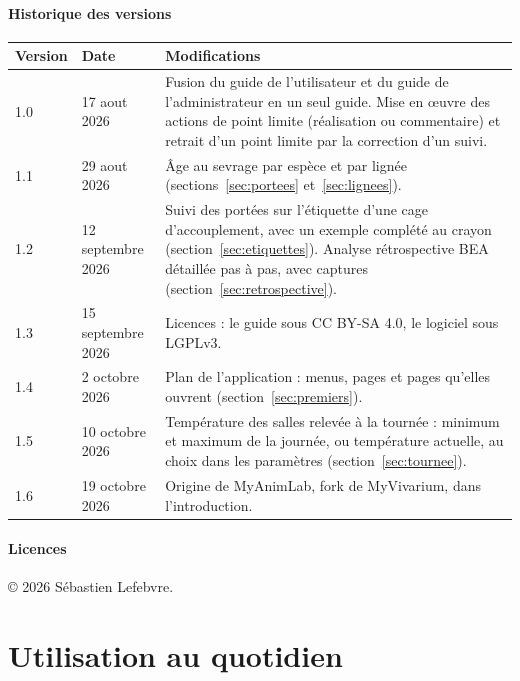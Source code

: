 \documentclass[11pt,a4paper]{article}
\begin{document}
\subsection*{Historique des versions}
\begin{center}
\small
{}
\begin{tabularx}{\textwidth}{@{}llX@{}}
\toprule
\textbf{Version} & \textbf{Date} & \textbf{Modifications}\\
\midrule
1.0 & 17 aout 2026 & Fusion du guide de l'utilisateur et du guide de l'administrateur en un seul guide. Mise en œuvre des actions de point limite (réalisation ou commentaire) et retrait d'un point limite par la correction d'un suivi.\\
1.1 & 29 aout 2026 & Âge au sevrage par espèce et par lignée (sections~\ref{sec:portees} et~\ref{sec:lignees}).\\
1.2 & 12 septembre 2026 & Suivi des portées sur l'étiquette d'une cage d'accouplement, avec un exemple complété au crayon (section~\ref{sec:etiquettes}). Analyse rétrospective BEA détaillée pas à pas, avec captures (section~\ref{sec:retrospective}).\\
1.3 & 15 septembre 2026 & Licences : le guide sous CC BY-SA 4.0, le logiciel sous LGPLv3.\\
1.4 & 2 octobre 2026 & Plan de l'application : menus, pages et pages qu'elles ouvrent (section~\ref{sec:premiers}).\\
1.5 & 10 octobre 2026 & Température des salles relevée à la tournée : minimum et maximum de la journée, ou température actuelle, au choix dans les paramètres (section~\ref{sec:tournee}).\\
1.6 & 19 octobre 2026 & Origine de MyAnimLab, fork de MyVivarium, dans l'introduction.\\
\bottomrule
\end{tabularx}
\end{center}

\subsection*{Licences}
\noindent © 2026 Sébastien Lefebvre.\par\smallskip
\noindent\licences

\newpage
\tableofcontents
\newpage

\part{Utilisation au quotidien}\label{part:utilisation}
\end{document}
